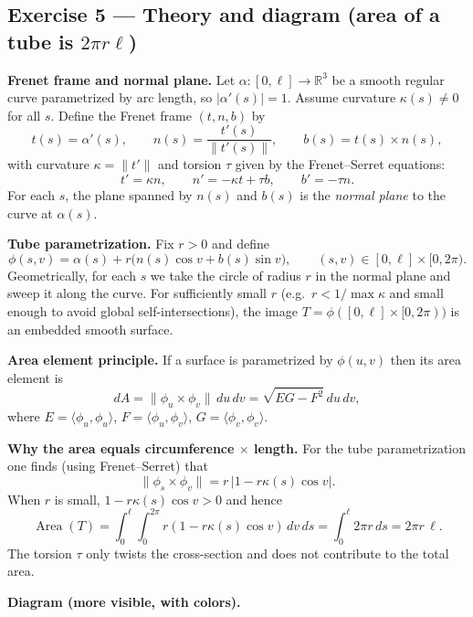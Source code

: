 \documentclass[12pt,a4paper]{article}
\theoremstyle{plain}
\theoremstyle{definition}      %
\begin{document}
	\subsection*{Exercise 5 --- Theory and diagram (area of a tube is $2\pi r\ell$)}
	
	\noindent\textbf{Frenet frame and normal plane.}
	Let $\alpha:[0,\ell]\to\mathbb R^3$ be a smooth regular curve parametrized by arc length, so $|\alpha'(s)|=1$.
	Assume curvature $\kappa(s)\neq 0$ for all $s$.
	Define the Frenet frame $(t,n,b)$ by
	\[
	t(s)=\alpha'(s),\qquad n(s)=\frac{t'(s)}{\|t'(s)\|},\qquad b(s)=t(s)\times n(s),
	\]
	with curvature $\kappa=\|t'\|$ and torsion $\tau$ given by the Frenet--Serret equations:
	\[
	t'=\kappa n,\qquad n'=-\kappa t+\tau b,\qquad b'=-\tau n.
	\]
	For each $s$, the plane spanned by $n(s)$ and $b(s)$ is the \emph{normal plane} to the curve at $\alpha(s)$.
	
	\medskip
	\noindent\textbf{Tube parametrization.}
	Fix $r>0$ and define
	\[
	\phi(s,v)=\alpha(s)+r\big(n(s)\cos v+b(s)\sin v\big),
	\qquad (s,v)\in[0,\ell]\times[0,2\pi).
	\]
	Geometrically, for each $s$ we take the circle of radius $r$ in the normal plane and sweep it along the curve.
	For sufficiently small $r$ (e.g.\ $r<1/\max\kappa$ and small enough to avoid global self-intersections),
	the image $T=\phi([0,\ell]\times[0,2\pi))$ is an embedded smooth surface.
	
	\medskip
	\noindent\textbf{Area element principle.}
	If a surface is parametrized by $\phi(u,v)$ then its area element is
	\[
	dA = \|\phi_u\times \phi_v\|\,du\,dv=\sqrt{EG-F^2}\,du\,dv,
	\]
	where $E=\langle \phi_u,\phi_u\rangle$, $F=\langle \phi_u,\phi_v\rangle$, $G=\langle \phi_v,\phi_v\rangle$.
	
	\medskip
	\noindent\textbf{Why the area equals circumference $\times$ length.}
	For the tube parametrization one finds (using Frenet--Serret) that
	\[
	\|\phi_s\times\phi_v\|=r\,|1-r\kappa(s)\cos v|.
	\]
	When $r$ is small, $1-r\kappa(s)\cos v>0$ and hence
	\[
	\operatorname{Area}(T)
	=\int_0^\ell\int_0^{2\pi} r(1-r\kappa(s)\cos v)\,dv\,ds
	=\int_0^\ell 2\pi r\,ds
	=2\pi r\,\ell.
	\]
	The torsion $\tau$ only twists the cross-section and does not contribute to the total area.
	
	\medskip
	\noindent\textbf{Diagram (more visible, with colors).}
	
\end{document}
